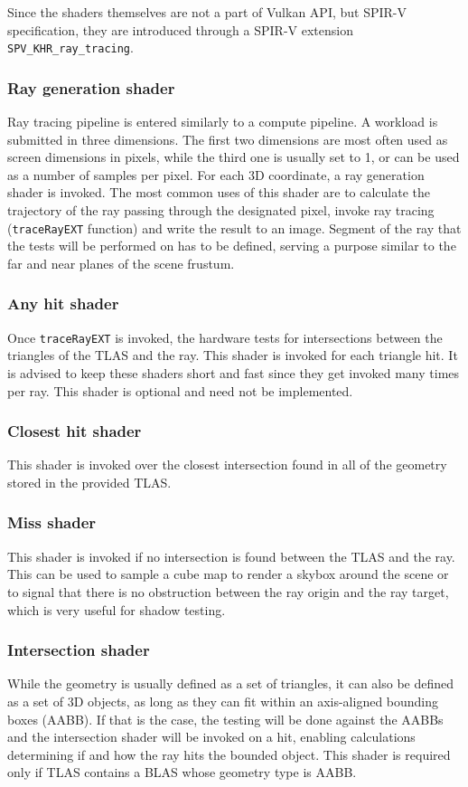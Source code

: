 \documentclass[times, utf8, zavrsni, numeric]{fer}
\begin{document}
Since the shaders themselves are not a part of Vulkan API, but SPIR-V specification, they are introduced through a SPIR-V extension \texttt{SPV\_KHR\_ray\_tracing}.

\subsubsection{Ray generation shader}
Ray tracing pipeline is entered similarly to a compute pipeline. A workload is submitted in three dimensions. The first two dimensions are most often used as screen dimensions in pixels, while the third one is usually set to 1, or can be used as a number of samples per pixel. For each 3D coordinate, a ray generation shader is invoked. The most common uses of this shader are to calculate the trajectory of the ray passing through the designated pixel, invoke ray tracing (\texttt{traceRayEXT} function) and write the result to an image. Segment of the ray that the tests will be performed on has to be defined, serving a purpose similar to the far and near planes of the scene frustum.

\subsubsection{Any hit shader}
Once \texttt{traceRayEXT} is invoked, the hardware tests for intersections between the triangles of the TLAS and the ray. This shader is invoked for each triangle hit. It is advised to keep these shaders short and fast since they get invoked many times per ray. This shader is optional and need not be implemented.

\subsubsection{Closest hit shader}
This shader is invoked over the closest intersection found in all of the geometry stored in the provided TLAS.

\subsubsection{Miss shader}
This shader is invoked if no intersection is found between the TLAS and the ray. This can be used to sample a cube map to render a skybox around the scene or to signal that there is no obstruction between the ray origin and the ray target, which is very useful for shadow testing.

\subsubsection{Intersection shader}
While the geometry is usually defined as a set of triangles, it can also be defined as a set of 3D objects, as long as they can fit within an axis-aligned bounding boxes (AABB). If that is the case, the testing will be done against the AABBs and the intersection shader will be invoked on a hit, enabling calculations determining if and how the ray hits the bounded object. This shader is required only if TLAS contains a BLAS whose geometry type is AABB.
\end{document}
